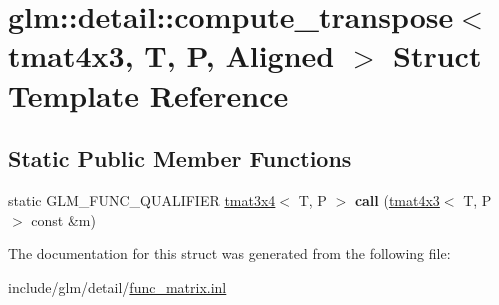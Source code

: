 \hypertarget{structglm_1_1detail_1_1compute__transpose_3_01tmat4x3_00_01T_00_01P_00_01Aligned_01_4}{}\section{glm\+:\+:detail\+:\+:compute\+\_\+transpose$<$ tmat4x3, T, P, Aligned $>$ Struct Template Reference}
\label{structglm_1_1detail_1_1compute__transpose_3_01tmat4x3_00_01T_00_01P_00_01Aligned_01_4}
\subsection*{Static Public Member Functions}
\begin{DoxyCompactItemize}
\item 
\mbox{\label{structglm_1_1detail_1_1compute__transpose_3_01tmat4x3_00_01T_00_01P_00_01Aligned_01_4_a1678412b806ed8c3bce9b305982b6726}} 
static G\+L\+M\+\_\+\+F\+U\+N\+C\+\_\+\+Q\+U\+A\+L\+I\+F\+I\+ER \hyperlink{structglm_1_1tmat3x4}{tmat3x4}$<$ T, P $>$ {\bfseries call} (\hyperlink{structglm_1_1tmat4x3}{tmat4x3}$<$ T, P $>$ const \&m)
\end{DoxyCompactItemize}


The documentation for this struct was generated from the following file\+:\begin{DoxyCompactItemize}
\item 
include/glm/detail/\hyperlink{func__matrix_8inl}{func\+\_\+matrix.\+inl}\end{DoxyCompactItemize}
